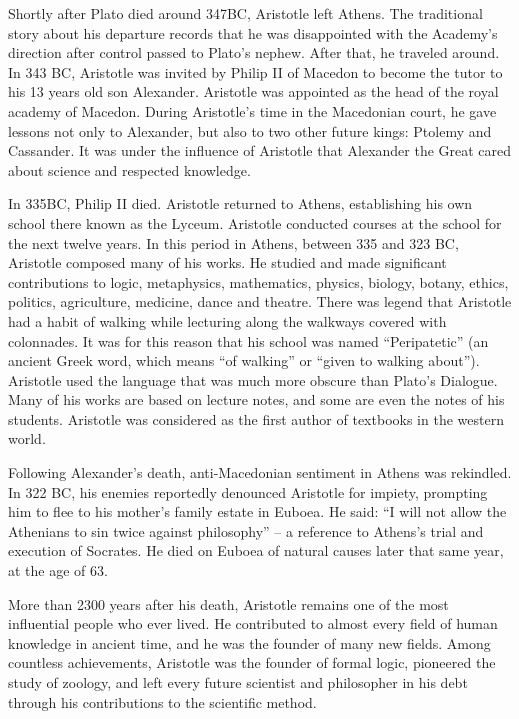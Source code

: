 \documentclass{article}
\begin{document}
Shortly after Plato died around 347BC, Aristotle left Athens. The traditional story about his departure records that he was disappointed with the Academy's direction after control passed to Plato's nephew. After that, he traveled around. In 343 BC, Aristotle was invited by Philip II of Macedon to become the tutor to his 13 years old son Alexander. Aristotle was appointed as the head of the royal academy of Macedon. During Aristotle's time in the Macedonian court, he gave lessons not only to Alexander, but also to two other future kings: Ptolemy and Cassander. It was under the influence of Aristotle that Alexander the Great cared about science and respected knowledge.

In 335BC, Philip II died. Aristotle returned to Athens, establishing his own school there known as the Lyceum. Aristotle conducted courses at the school for the next twelve years. In this period in Athens, between 335 and 323 BC, Aristotle composed many of his works. He studied and made significant contributions to logic, metaphysics, mathematics, physics, biology, botany, ethics, politics, agriculture, medicine, dance and theatre. There was legend that Aristotle had a habit of walking while lecturing along the walkways covered with colonnades. It was for this reason that his school was named ``Peripatetic'' (an ancient Greek word, which means ``of walking'' or ``given to walking about''). Aristotle used the language that was much more obscure than Plato's Dialogue. Many of his works are based on lecture notes, and some are even the notes of his students. Aristotle was considered as the first author of textbooks in the western world.

Following Alexander's death, anti-Macedonian sentiment in Athens was rekindled. In 322 BC, his enemies reportedly denounced Aristotle for impiety, prompting him to flee to his mother's family estate in Euboea. He said: ``I will not allow the Athenians to sin twice against philosophy'' – a reference to Athens's trial and execution of Socrates. He died on Euboea of natural causes later that same year, at the age of 63.

More than 2300 years after his death, Aristotle remains one of the most influential people who ever lived. He contributed to almost every field of human knowledge in ancient time, and he was the founder of many new fields. Among countless achievements, Aristotle was the founder of formal logic, pioneered the study of zoology, and left every future scientist and philosopher in his debt through his contributions to the scientific method.
\end{document}
